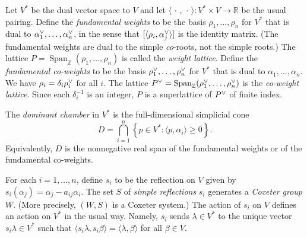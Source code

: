 \documentclass[ALCO,ThmDefs,Unicode,epreuves]{cedram}
\DeclareMathOperator{\Span}{Span}
\newcommand{\newword}[1]{\emph{#1}}
\newcommand{\integers}{\mathbb Z}
\newcommand{\reals}{\mathbb R}
\newcommand{\set}[1]{{\left\lbrace #1 \right\rbrace}}
\newcommand{\br}[1]{{\langle #1 \rangle}}
\newcommand{\ck}{\spcheck}
\begin{document}
Let $V^*$ be the dual vector space to $V$ and let $\br{\,\cdot\,,\,\cdot\,}:V^*\times V\to\reals$ be the usual pairing.
Define the \newword{fundamental weights} to be the basis $\rho_1,\ldots,\rho_n$ for $V^*$ that is dual to $\alpha_1\ck,\ldots,\alpha_n\ck$, in the sense that $[\br{\rho_i,\alpha\ck_j}]$ is the identity matrix.
(The fundamental weights are dual to the simple \emph{co}-roots, not the simple roots.)
The lattice $P=\Span_\integers(\rho_1,\ldots,\rho_n)$ is called the \newword{weight lattice}.
Define the \newword{fundamental co-weights} to be the basis $\rho_1\ck,\ldots,\rho_n\ck$ for $V^*$ that is dual to $\alpha_1,\ldots,\alpha_n$.
We have $\rho_i=\delta_i\rho_i\ck$ for all $i$.
The lattice $P\ck=\Span_\integers(\rho_1\ck,\ldots,\rho_n\ck)$ is the \newword{co-weight lattice}.
Since each $\delta_i^{-1}$ is an integer, $P$ is a superlattice of $P\ck$ of finite index.

The \newword{dominant chamber} in $V^*$ is the full-dimensional simplicial cone
\begin{equation}\label{D def}
D=\bigcap_{i=1}^n \set{p\in V^*: \br{p,\alpha_i}\ge 0}.
\end{equation}
Equivalently, $D$ is the nonnegative real span of the fundamental weights or of the fundamental co-weights.




For each $i=1,\ldots,n$, define $s_i$ to be the reflection on $V$ given by $s_i(\alpha_j)=\alpha_j-a_{ij}\alpha_i$.
The set $S$ of \newword{simple reflections} $s_i$ generates a \newword{Coxeter group} $W$.
(More precisely, $(W,S)$ is a Coxeter system.)
The action of $s_i$ on $V$ defines an action on $V^*$ in the usual way.
Namely, $s_i$ sends $\lambda\in V^*$ to the unique vector $s_i\lambda\in V^*$ such that $\br{s_i\lambda,s_i\beta}=\br{\lambda,\beta}$ for all $\beta\in V$.
\end{document}
